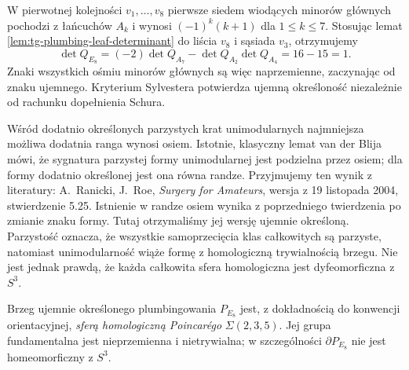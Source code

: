 \begin{uwaga}
W pierwotnej kolejności $v_1,\ldots,v_8$ pierwsze
siedem wiodących minorów głównych pochodzi
z łańcuchów $A_k$ i wynosi $(-1)^k(k+1)$
dla $1\le k\le7$.
Stosując lemat \ref{lem:tg-plumbing-leaf-determinant}
do liścia $v_8$ i sąsiada $v_3$, otrzymujemy
\[
\det Q_{E_8}=(-2)\det Q_{A_7}
-\det Q_{A_2}\det Q_{A_4}=16-15=1.
\]
Znaki wszystkich ośmiu minorów głównych
są więc naprzemienne, zaczynając od znaku
ujemnego. Kryterium Sylvestera potwierdza
ujemną określoność niezależnie od rachunku
dopełnienia Schura.
\end{uwaga}

\begin{uwaga}
Wśród dodatnio określonych parzystych krat unimodularnych
najmniejsza możliwa dodatnia ranga wynosi osiem.
Istotnie, klasyczny lemat van der Blija mówi,
że sygnatura parzystej formy unimodularnej
jest podzielna przez osiem; dla formy dodatnio
określonej jest ona równa randze.
Przyjmujemy ten wynik z literatury:
A.~Ranicki, J.~Roe, \emph{Surgery for Amateurs},
wersja z 19 listopada 2004, stwierdzenie 5.25.
Istnienie w randze osiem wynika z poprzedniego
twierdzenia po zmianie znaku formy.
Tutaj otrzymaliśmy jej wersję ujemnie określoną.
Parzystość oznacza, że wszystkie samoprzecięcia klas
całkowitych są parzyste, natomiast unimodularność
wiąże formę z homologiczną trywialnością brzegu.
Nie jest jednak prawdą, że każda całkowita sfera
homologiczna jest dyfeomorficzna z $S^3$.
\end{uwaga}

\begin{stwierdzenie}
\label{st:tg-E8-poincare}
Brzeg ujemnie określonego plumbingowania $P_{E_8}$
jest, z dokładnością do konwencji orientacyjnej,
\emph{sferą homologiczną Poincarégo}
$\Sigma(2,3,5)$. Jej grupa fundamentalna jest
nieprzemienna i nietrywialna; w szczególności
$\partial P_{E_8}$ nie jest homeomorficzny z $S^3$.
\end{stwierdzenie}

